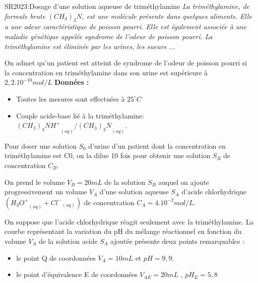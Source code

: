 \documentclass[12pt]{article}
\begin{document}
\begin{Box2}{SR2023:Dosage d’une solution aqueuse de triméthylamine}
  \emph{La triméthylamine, de formule brute $(CH_3)_3N$, est une molécule présente dans quelques aliments. Elle a
une odeur caractéristique de poisson pourri. Elle est également associée à une maladie génétique appelée
  syndrome de l’odeur de poisson pourri. La triméthylamine est éliminée par les urines, les sueurs ...}
  
On admet qu’un patient est atteint de syndrome de l’odeur de poisson pourri si la concentration en
triméthylamine dans son urine est supérieure à $2,2.10^{-10} mol/L$
  \textbf{Données : }
\begin{itemize}
  \item Toutes les mesures sont effectuées à $25^{\circ}C$
  \item Couple acide-base lié à la triméthylamine:  ${(CH_3)_3NH^+}_{(aq)}/ {(CH_3)_3N}_{(aq)}$.
 
\end{itemize}

Pour doser une solution $S_0$ d’urine d’un patient dont la concentration en triméthylamine est C0, on la dilue
10 fois pour obtenir une solution $S_B$ de concentration $C_B$.

On prend le volume $V_B = 20mL$ de la solution $S_B$ auquel on ajoute progressivement un volume $V_A$ d’une solution aqueuse $S_A$ d’acide chlorhydrique $({H_3O^+}_{(aq)} + {Cl^-}_{(aq)})$ de concentration $C_A = 4.10^{-2}mol/L$. 
  
  On suppose que l’acide chlorhydrique réagit seulement avec la triméthylamine. La courbe représentant la variation du pH du mélange réactionnel en fonction du volume $V_A$ de la solution acide $S_A$ ajoutée présente deux points remarquables :

\begin{itemize}
  \item le point Q de coordonnées $V_A = 10mL$ et $pH=9,9$.
  \item le point d'équivalence E de coordonnées $V_{AE} = 20mL$ , $pH_E = 5,8$
\end{itemize}



\end{Box2}
\end{document}
